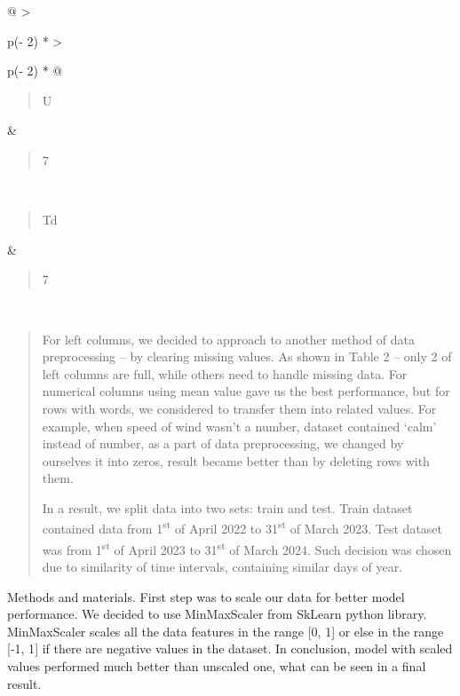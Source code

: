\begin{longtable}[]{@{}
  >{\raggedright\arraybackslash}p{(\columnwidth - 2\tabcolsep) * }
  >{\raggedright\arraybackslash}p{(\columnwidth - 2\tabcolsep) * }@{}}
\begin{minipage}[t]{\linewidth}
\begin{quote}
U
\end{quote}
\end{minipage} & \begin{minipage}[t]{\linewidth}\raggedright
\begin{quote}
7
\end{quote}
\end{minipage} \\
\begin{minipage}[t]{\linewidth}\raggedright
\begin{quote}
Td
\end{quote}
\end{minipage} & \begin{minipage}[t]{\linewidth}\raggedright
\begin{quote}
7
\end{quote}
\end{minipage} \\
\end{longtable}

\begin{quote}
For left columns, we decided to approach to another method of data
preprocessing -- by clearing missing values. As shown in Table 2 -- only
2 of left columns are full, while others need to handle missing data.
For numerical columns using mean value gave us the best performance, but
for rows with words, we considered to transfer them into related values.
For example, when speed of wind wasn't a number, dataset contained
`calm' instead of number, as a part of data preprocessing, we changed by
ourselves it into zeros, result became better than by deleting rows with
them.

In a result, we split data into two sets: train and test. Train dataset
contained data from 1\textsuperscript{st} of April 2022 to
31\textsuperscript{st} of March 2023. Test dataset was from
1\textsuperscript{st} of April 2023 to 31\textsuperscript{st} of March
2024. Such decision was chosen due to similarity of time intervals,
containing similar days of year.
\end{quote}

Methods and materials. First step was to scale our data for better model
performance. We decided to use MinMaxScaler from SkLearn python library.
MinMaxScaler scales all the data features in the range {[}0, 1{]} or
else in the range {[}-1, 1{]} if there are negative values in the
dataset. In conclusion, model with scaled values performed much better
than unscaled one, what can be seen in a final result.

